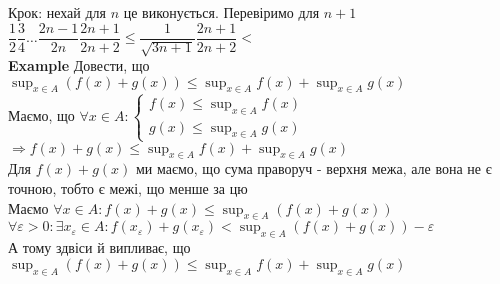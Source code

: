 \documentclass[a4paper, 14pt]{extarticle}
\def\huge{\displaystyle}
\def\bigline{\vspace{5mm}\\}
\def\ex#1{\textbf{Example {#1}}}
\def\bigline{\vspace{5mm}\\}
\begin{document}
Крок: нехай для $n$ це виконується. Перевіримо для $n+1$\\
$\dfrac{1}{2} \dfrac{3}{4} \dots \dfrac{2n-1}{2n} \dfrac{2n+1}{2n+2} \leq \dfrac{1}{\sqrt{3n+1}} \dfrac{2n+1}{2n+2} < $
\bigline
\ex{} Довести, що $\huge \sup_{x \in A} (f(x) + g(x)) \leq \sup_{x \in A}f(x) + \sup_{x \in A} g(x)$
\bigline
Маємо, що $\huge \forall x \in A: \begin{cases} f(x) \huge \leq \sup_{x \in A} f(x) \\\huge g(x) \leq \sup_{x \in A} g(x) \end{cases}$\\
$\Rightarrow f(x) + g(x) \leq \huge \sup_{x \in A}f(x) + \sup_{x \in A}g(x)$\\
Для $f(x) + g(x)$ ми маємо, що сума праворуч - верхня межа, але вона не є точною, тобто є межі, що менше за цю\\
Маємо $\forall x \in A: f(x) + g(x) \leq \huge \sup_{x \in A} (f(x) + g(x))$\\
$\forall \varepsilon > 0: \exists x_{\varepsilon} \in A: f(x_{\varepsilon}) + g(x_{\varepsilon}) < \huge \sup_{x \in A} (f(x) + g(x)) - \varepsilon$\\
А тому здвіси й випливає, що $\huge \sup_{x \in A} (f(x) + g(x)) \leq \sup_{x \in A}f(x) + \sup_{x \in A} g(x)$
\end{document}
